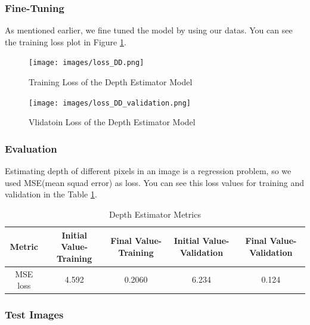 \documentclass[a4paper, openany]{book}
\begin{document}
		
\newpage

\subsubsection{Fine-Tuning}
	\vspace{0.3cm}



As mentioned earlier, we fine tuned the model by using our datas. You can see the training loss plot in Figure \ref{fig:loss_DD}.

\begin{figure}[ht]
  \centering
    \texttt{[image: images/loss\_DD.png]}
      \caption{Training Loss of the Depth Estimator Model}
  \label{fig:loss_DD}
\end{figure}

\begin{figure}[ht]
  \centering
    \texttt{[image: images/loss\_DD\_validation.png]}
      \caption{Vlidatoin Loss of the Depth Estimator Model}
  \label{fig:loss_DD_validation}
\end{figure}

	
\subsubsection{Evaluation}
	\vspace{0.3cm}
	
Estimating depth of different pixels in an image is a regression problem, so we used MSE(mean squad error) as loss. You can see this loss values for training and validation in the Table \ref{table:DD_Metrics}.

\begin{table}[htp]
\caption{Depth Estimator Metrics}
\begin{center}
\begin{tabular}{c | c | c | c | c}
Metric & Initial Value-Training & Final Value-Training &  Initial Value-Validation & Final Value-Validation\\
\hline
MSE loss &4.592 & 0.2060 & 6.234 & 0.124\\
\end{tabular}
\end{center}
\label{table:DD_Metrics}
\end{table}%




\newpage

\subsubsection{Test Images}
	\vspace{0.3cm}
	
\end{document}
